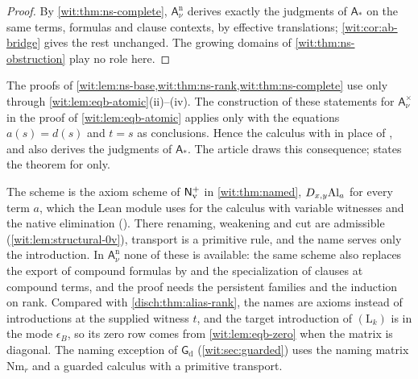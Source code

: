 \begin{proof}
By \cref{wit:thm:ns-complete}, $\mathsf{A}^{\mathrm n}_{\nu}$ derives exactly
the judgments of $\mathsf{A}_{\ast}$ on the same terms, formulas and clause
contexts, by effective translations; \cref{wit:cor:ab-bridge} gives the rest
unchanged.  The growing domains of \cref{wit:thm:ns-obstruction} play no role
here.
\end{proof}

\begin{remark}
\label{wit:rem:ns-xback}
The proofs of \cref{wit:lem:ns-base,wit:thm:ns-rank,wit:thm:ns-complete} use
 only through \cref{wit:lem:eqb-atomic}(ii)--(iv).  The
construction of these statements for $\mathsf{A}^{\times}_{\nu}$ in the proof
of \cref{wit:lem:eqb-atomic} applies  only with the
equations $a(s)=d(s)$ and $t=s$ as conclusions.  Hence the calculus with
 in place of ,  and
 also derives the judgments of $\mathsf{A}_{\ast}$.  The
article draws this consequence;  states the theorem
for  only.
\end{remark}

\begin{remark}
\label{wit:rem:ns-compare}
The scheme  is the axiom scheme of $\mathsf{N}_{\mathrm v}^{+}$ in
\cref{wit:thm:named}, $D_{x,y}\mathrm{Al}_a$ for every term $a$, which the
Lean module  uses for the calculus  with
variable witnesses and the native elimination ().
There renaming, weakening and cut are admissible
(\cref{wit:lem:structural-0v}), transport is a primitive rule, and the name
serves only the introduction.  In $\mathsf{A}^{\mathrm n}_{\nu}$ none of these
is available: the same scheme also replaces the export of compound formulas
by  and the specialization of clauses at compound terms, and
the proof needs the persistent families and the induction on rank.
Compared with \cref{disch:thm:alias-rank}, the names are axioms instead of
introductions at the supplied witness $t$, and the target introduction of
$(\mathrm L_k)$ is in the mode $\epsilon_B$, so its zero row comes from
\cref{wit:lem:eqb-zero} when the matrix is diagonal.  The naming exception
of $\mathsf{G}_{\mathrm d}$ (\cref{wit:sec:guarded}) uses the naming matrix
$\mathrm{Nm}_r$ and a guarded calculus with a primitive transport.
\end{remark}


